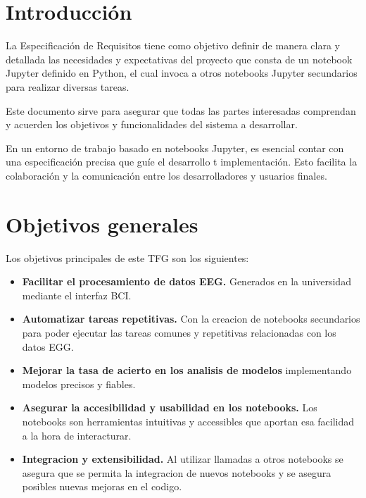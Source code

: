 
\section{Introducción}

La Especificación de Requisitos tiene como objetivo definir de manera clara y detallada las necesidades y expectativas del proyecto que consta de un notebook Jupyter definido en Python, el cual invoca a otros notebooks Jupyter secundarios para realizar diversas tareas. 

Este documento sirve para asegurar que todas las partes interesadas comprendan y acuerden los objetivos y funcionalidades del sistema a desarrollar.

En un entorno de trabajo basado en notebooks Jupyter, es esencial contar con una especificación precisa que guíe el desarrollo t implementación. Esto facilita la colaboración y la comunicación entre los desarrolladores y usuarios finales.


\section{Objetivos generales}

Los objetivos principales de este TFG son los siguientes:

\begin{itemize}
\tightlist
\item
	\textbf{Facilitar el procesamiento de datos EEG.} Generados en la universidad mediante el interfaz BCI.  	
\item
 	\textbf{Automatizar tareas repetitivas.} Con la creacion de notebooks secundarios para poder ejecutar las tareas comunes y repetitivas relacionadas con los datos EGG. 
\item
	\textbf{Mejorar la tasa de acierto en los analisis de modelos} implementando modelos precisos y fiables. 
\item
	\textbf{Asegurar la accesibilidad y usabilidad en los notebooks.} Los notebooks son herramientas intuitivas y accessibles que aportan esa facilidad a la hora de interacturar.
\item
	\textbf{Integracion y extensibilidad.} Al utilizar llamadas a otros notebooks se asegura que se permita la integracion de nuevos notebooks y se asegura posibles nuevas mejoras en el codigo.
		
\end{itemize}



